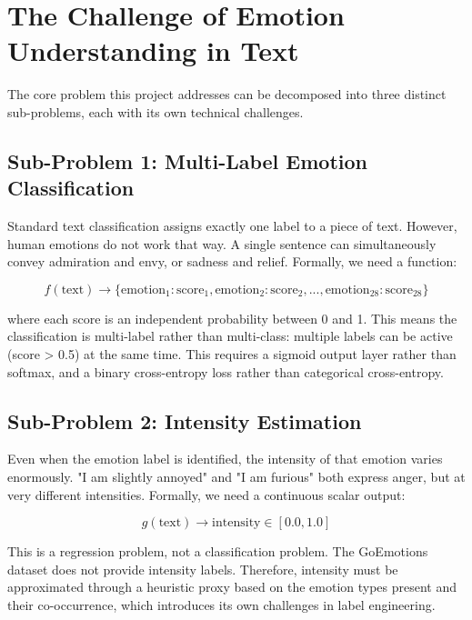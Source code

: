 \documentclass[12pt, a4paper]{report}
\begin{document}
\section{The Challenge of Emotion Understanding in Text}

The core problem this project addresses can be decomposed into three distinct sub-problems, each with its own technical challenges.

\subsection{Sub-Problem 1: Multi-Label Emotion Classification}

Standard text classification assigns exactly one label to a piece of text. However, human emotions do not work that way. A single sentence can simultaneously convey admiration and envy, or sadness and relief. Formally, we need a function:

\begin{equation}
    f(\text{text}) \rightarrow \{\text{emotion}_1: \text{score}_1, \text{emotion}_2: \text{score}_2, ..., \text{emotion}_{28}: \text{score}_{28}\}
\end{equation}

where each score is an independent probability between 0 and 1. This means the classification is multi-label rather than multi-class: multiple labels can be active (score > 0.5) at the same time. This requires a sigmoid output layer rather than softmax, and a binary cross-entropy loss rather than categorical cross-entropy.

\subsection{Sub-Problem 2: Intensity Estimation}

Even when the emotion label is identified, the intensity of that emotion varies enormously. "I am slightly annoyed" and "I am furious" both express anger, but at very different intensities. Formally, we need a continuous scalar output:

\begin{equation}
    g(\text{text}) \rightarrow \text{intensity} \in [0.0, 1.0]
\end{equation}

This is a regression problem, not a classification problem. The GoEmotions dataset does not provide intensity labels. Therefore, intensity must be approximated through a heuristic proxy based on the emotion types present and their co-occurrence, which introduces its own challenges in label engineering.
\end{document}

